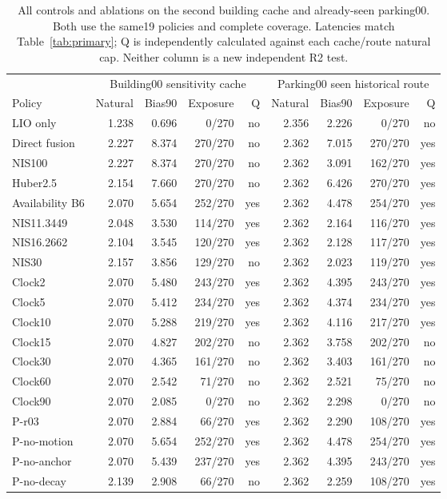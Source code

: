 \begin{table}[t]\centering\small
\caption{All controls and ablations on the second building cache and already-seen parking00. Both use the same19 policies and complete coverage. Latencies match Table~\ref{tab:primary}; Q is independently calculated against each cache/route natural cap. Neither column is a new independent R2 test.}\label{tab:other}
\begin{tabular}{lrrrrrrrr}\toprule
 & \multicolumn{4}{c}{Building00 sensitivity cache} & \multicolumn{4}{c}{Parking00 seen historical route}\\
Policy & Natural & Bias90 & Exposure & Q & Natural & Bias90 & Exposure & Q\\\midrule
LIO only & 1.238 & 0.696 & 0/270 & no & 2.356 & 2.226 & 0/270 & no \\
Direct fusion & 2.227 & 8.374 & 270/270 & no & 2.362 & 7.015 & 270/270 & yes \\
NIS100 & 2.227 & 8.374 & 270/270 & no & 2.362 & 3.091 & 162/270 & yes \\
Huber2.5 & 2.154 & 7.660 & 270/270 & no & 2.362 & 6.426 & 270/270 & yes \\
Availability B6 & 2.070 & 5.654 & 252/270 & yes & 2.362 & 4.478 & 254/270 & yes \\
NIS11.3449 & 2.048 & 3.530 & 114/270 & yes & 2.362 & 2.164 & 116/270 & yes \\
NIS16.2662 & 2.104 & 3.545 & 120/270 & yes & 2.362 & 2.128 & 117/270 & yes \\
NIS30 & 2.157 & 3.856 & 129/270 & no & 2.362 & 2.023 & 119/270 & yes \\
Clock2 & 2.070 & 5.480 & 243/270 & yes & 2.362 & 4.395 & 243/270 & yes \\
Clock5 & 2.070 & 5.412 & 234/270 & yes & 2.362 & 4.374 & 234/270 & yes \\
Clock10 & 2.070 & 5.288 & 219/270 & yes & 2.362 & 4.116 & 217/270 & yes \\
Clock15 & 2.070 & 4.827 & 202/270 & no & 2.362 & 3.758 & 202/270 & no \\
Clock30 & 2.070 & 4.365 & 161/270 & no & 2.362 & 3.403 & 161/270 & no \\
Clock60 & 2.070 & 2.542 & 71/270 & no & 2.362 & 2.521 & 75/270 & no \\
Clock90 & 2.070 & 2.085 & 0/270 & no & 2.362 & 2.298 & 0/270 & no \\
P-r03 & 2.070 & 2.884 & 66/270 & yes & 2.362 & 2.290 & 108/270 & yes \\
P-no-motion & 2.070 & 5.654 & 252/270 & yes & 2.362 & 4.478 & 254/270 & yes \\
P-no-anchor & 2.070 & 5.439 & 237/270 & yes & 2.362 & 4.395 & 243/270 & yes \\
P-no-decay & 2.139 & 2.908 & 66/270 & no & 2.362 & 2.259 & 108/270 & yes \\
\bottomrule\end{tabular}\end{table}
